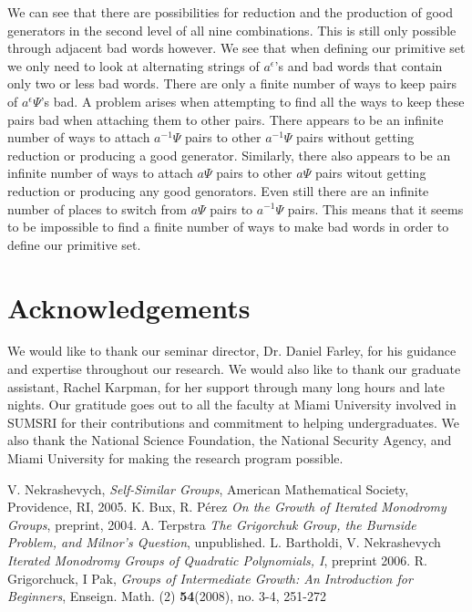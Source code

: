 \documentclass[11pt]{amsart}
\theoremstyle{definition}
\theoremstyle{remark}
\numberwithin{equation}{section}
\begin{document}
We can see that there are possibilities for reduction and the production of good generators in the second level of all nine combinations.  This is still only possible through adjacent bad words however.  We see that when defining our primitive set we only need to look at alternating strings of $a^{\epsilon}$'s and bad words that contain only two or less bad words. There are only a finite number of ways to keep pairs of $a^{\epsilon}\Psi$'s bad.  A problem arises when attempting to find all the ways to keep these pairs bad when attaching them to other pairs.  There appears to be an infinite number of ways to attach $a^{-1}\Psi$ pairs to other $a^{-1}\Psi$ pairs without getting reduction or producing a good generator.  Similarly, there also appears to be an infinite number of ways to attach $a\Psi$ pairs to other $a\Psi$ pairs witout getting reduction or producing any good genorators.  Even still there are an infinite number of places to switch from $a\Psi$ pairs to $a^{-1}\Psi$ pairs.  This means that it seems to be impossible to find a finite number of ways to make bad words in order to define our primitive set.

\section{Acknowledgements}

We would like to thank our seminar director, Dr. Daniel Farley, for his guidance and expertise throughout our research. We would also like to thank our graduate assistant, Rachel Karpman, for her support through many long hours and late nights. Our gratitude goes out to all the faculty at Miami University involved in SUMSRI for their contributions and commitment to helping undergraduates. We also thank the National Science Foundation, the National Security Agency, and Miami University for making the research program possible.






\begin{thebibliography}{999}

 V. Nekrashevych, {\it Self-Similar Groups}, American Mathematical Society, Providence, RI, 2005.
 K. Bux, R. P\'{e}rez {\it On the Growth of Iterated Monodromy Groups}, preprint, 2004.
 A. Terpstra {\it The Grigorchuk Group, the Burnside Problem, and Milnor's Question}, unpublished.
 L. Bartholdi, V. Nekrashevych {\it Iterated Monodromy Groups of Quadratic Polynomials, I}, preprint 2006.
 R. Grigorchuck, I Pak, {\it Groups of Intermediate Growth: An Introduction for Beginners}, Enseign. Math. (2) \textbf{54}(2008), no. 3-4, 251-272







\end{thebibliography}
\end{document}
